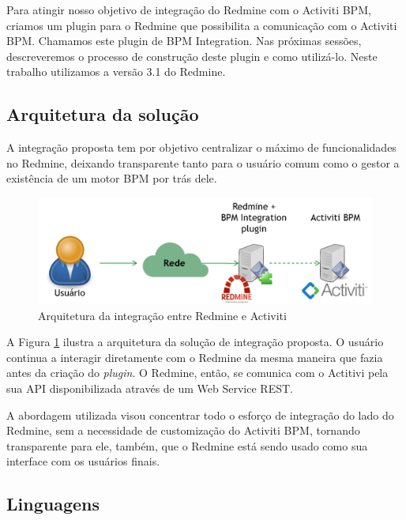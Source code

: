 Para atingir nosso objetivo de integração do Redmine com o Activiti BPM, criamos um plugin para o Redmine que possibilita a comunicação com o Activiti BPM. Chamamos este plugin de BPM Integration. Nas próximas sessões, descreveremos o processo de construção deste plugin e como utilizá-lo. Neste trabalho utilizamos a versão 3.1 do Redmine\cite{redmine31}.

\subsection{Arquitetura da solução}\label{sec:integracao_redmine_activiti_implementacao-arquitetura}

A integração proposta tem por objetivo centralizar o máximo de funcionalidades no Redmine, deixando transparente tanto para o usuário comum como o gestor a existência de um motor BPM por trás dele.

\begin{figure}[H]
\centering
\includegraphics[width=1\textwidth]{imagens/arquitetura_desenvolvida_bpm_integration.png}
\caption{Arquitetura da integração entre Redmine e Activiti}
\label{fig:arquitetura_integracao_redmine_bpm}
\end{figure}

A Figura \ref{fig:arquitetura_integracao_redmine_bpm} ilustra a arquitetura da solução de integração proposta. O usuário continua a interagir diretamente com o Redmine da mesma maneira que fazia antes da criação do \textit{plugin}. O Redmine, então, se comunica com o Actitivi pela sua API disponibilizada através de um Web Service REST.

A abordagem utilizada visou concentrar todo o esforço de integração do lado do Redmine, sem a necessidade de customização do Activiti BPM, tornando transparente para ele, também, que o Redmine está sendo usado como sua interface com os usuários finais.
    
\subsection{Linguagens}\label{sec:integracao_redmine_activiti_implementacao_detalhes_desenvolvimento_linguagens}

